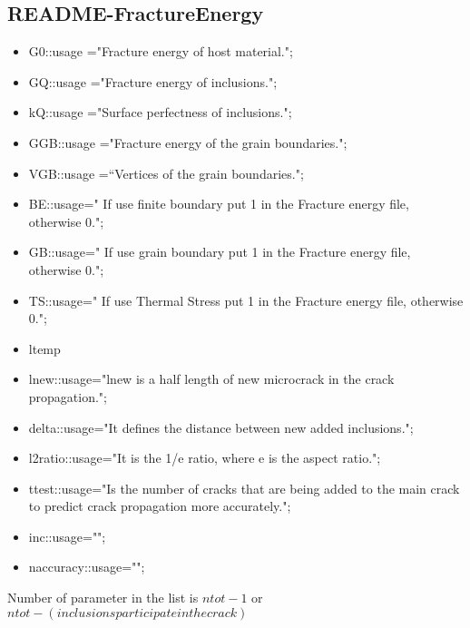 \documentclass[12pt]{article}
\numberwithin{equation}{subsection}
\begin{document}
\clearpage
\subsection{README-FractureEnergy}

\begin{itemize}

\item  G0::usage ="Fracture energy of host material.";
\item  GQ::usage ="Fracture energy of inclusions.";
\item  kQ::usage ="Surface perfectness of inclusions.";
\item  GGB::usage ="Fracture energy of the grain boundaries.";
\item  VGB::usage =“Vertices of the grain boundaries.";
\item  BE::usage=" If use finite boundary put 1 in the Fracture energy file, otherwise 0."; 
\item  GB::usage=" If use grain boundary put 1 in the Fracture energy file, otherwise 0."; 
\item  TS::usage=" If use Thermal Stress put 1 in the Fracture energy file, otherwise 0."; 

\item  ltemp

\item  lnew::usage="lnew is a half length of new microcrack in the crack propagation."; 

\item  delta::usage="It defines the distance between new added inclusions.";

\item  l2ratio::usage="It is the 1/e ratio, where e is the aspect ratio.";

\item  ttest::usage="Is the number of cracks that are being added to the main crack to predict crack propagation more accurately.";

\item inc::usage="";

\item naccuracy::usage="";

\end{itemize}

Number of parameter in the list is $ntot -1$ or $ntot-(inclusions participate in the crack)$



\clearpage
\end{document}
